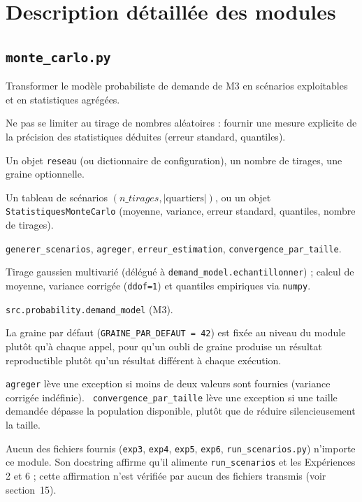\documentclass[11pt,a4paper]{article}
\begin{document}
\section{Description détaillée des modules}

\subsection{\texttt{monte\_carlo.py}}

\begin{description}[style=nextline]
  \item[Rôle] Transformer le modèle probabiliste de demande de M3 en
  scénarios exploitables et en statistiques agrégées.
  \item[Objectif] Ne pas se limiter au tirage de nombres aléatoires : fournir
  une mesure explicite de la précision des statistiques déduites (erreur
  standard, quantiles).
  \item[Entrées] Un objet \texttt{reseau} (ou dictionnaire de configuration),
  un nombre de tirages, une graine optionnelle.
  \item[Sorties] Un tableau de scénarios $(n\_tirages, |\text{quartiers}|)$,
  ou un objet \texttt{StatistiquesMonteCarlo} (moyenne, variance, erreur
  standard, quantiles, nombre de tirages).
  \item[Principales fonctions] \texttt{generer\_scenarios},
  \texttt{agreger}, \texttt{erreur\_estimation},
  \texttt{convergence\_par\_taille}.
  \item[Algorithmes] Tirage gaussien multivarié (délégué à
  \texttt{demand\_model.echantillonner}) ; calcul de moyenne, variance
  corrigée (\texttt{ddof=1}) et quantiles empiriques via \texttt{numpy}.
  \item[Dépendances] \texttt{src.probability.demand\_model} (M3).
  \item[Hypothèses] La graine par défaut (\texttt{GRAINE\_PAR\_DEFAUT = 42})
  est fixée au niveau du module plutôt qu'à chaque appel, pour qu'un oubli de
  graine produise un résultat reproductible plutôt qu'un résultat différent à
  chaque exécution.
  \item[Contrôles] \texttt{agreger} lève une exception si moins de deux
  valeurs sont fournies (variance corrigée indéfinie). \texttt{
  convergence\_par\_taille} lève une exception si une taille demandée dépasse
  la population disponible, plutôt que de réduire silencieusement la taille.
  \item[Fichiers qui l'utilisent] Aucun des fichiers fournis (\texttt{exp3},
  \texttt{exp4}, \texttt{exp5}, \texttt{exp6}, \texttt{run\_scenarios.py})
  n'importe ce module. Son docstring affirme qu'il alimente
  \texttt{run\_scenarios} et les Expériences 2 et 6 ; cette affirmation n'est
  vérifiée par aucun des fichiers transmis (voir section~15).
\end{description}
\end{document}
